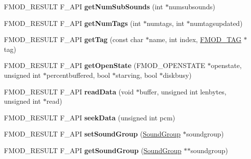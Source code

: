 \begin{DoxyCompactItemize}
\item 
F\+M\+O\+D\+\_\+\+R\+E\+S\+U\+LT F\+\_\+\+A\+PI {\bfseries get\+Num\+Sub\+Sounds} (int $\ast$numsubsounds)\hypertarget{class_f_m_o_d_1_1_sound_ade84503ee47f6c08a1116899c4b59ab7}{}\label{class_f_m_o_d_1_1_sound_ade84503ee47f6c08a1116899c4b59ab7}

\item 
F\+M\+O\+D\+\_\+\+R\+E\+S\+U\+LT F\+\_\+\+A\+PI {\bfseries get\+Num\+Tags} (int $\ast$numtags, int $\ast$numtagsupdated)\hypertarget{class_f_m_o_d_1_1_sound_af676bc0be9a87128c8b09f104a4ce31c}{}\label{class_f_m_o_d_1_1_sound_af676bc0be9a87128c8b09f104a4ce31c}

\item 
F\+M\+O\+D\+\_\+\+R\+E\+S\+U\+LT F\+\_\+\+A\+PI {\bfseries get\+Tag} (const char $\ast$name, int index, \hyperlink{struct_f_m_o_d___t_a_g}{F\+M\+O\+D\+\_\+\+T\+AG} $\ast$tag)\hypertarget{class_f_m_o_d_1_1_sound_abb0b254a45594e485e95ed4eab9fd1b3}{}\label{class_f_m_o_d_1_1_sound_abb0b254a45594e485e95ed4eab9fd1b3}

\item 
F\+M\+O\+D\+\_\+\+R\+E\+S\+U\+LT F\+\_\+\+A\+PI {\bfseries get\+Open\+State} (F\+M\+O\+D\+\_\+\+O\+P\+E\+N\+S\+T\+A\+TE $\ast$openstate, unsigned int $\ast$percentbuffered, bool $\ast$starving, bool $\ast$diskbusy)\hypertarget{class_f_m_o_d_1_1_sound_a2c3115f9bd9343b7d3b09b2e4edbb8b3}{}\label{class_f_m_o_d_1_1_sound_a2c3115f9bd9343b7d3b09b2e4edbb8b3}

\item 
F\+M\+O\+D\+\_\+\+R\+E\+S\+U\+LT F\+\_\+\+A\+PI {\bfseries read\+Data} (void $\ast$buffer, unsigned int lenbytes, unsigned int $\ast$read)\hypertarget{class_f_m_o_d_1_1_sound_af58de66a892b9e49a513502288cf930b}{}\label{class_f_m_o_d_1_1_sound_af58de66a892b9e49a513502288cf930b}

\item 
F\+M\+O\+D\+\_\+\+R\+E\+S\+U\+LT F\+\_\+\+A\+PI {\bfseries seek\+Data} (unsigned int pcm)\hypertarget{class_f_m_o_d_1_1_sound_ac73572153744ba36367391939cd3bc5e}{}\label{class_f_m_o_d_1_1_sound_ac73572153744ba36367391939cd3bc5e}

\item 
F\+M\+O\+D\+\_\+\+R\+E\+S\+U\+LT F\+\_\+\+A\+PI {\bfseries set\+Sound\+Group} (\hyperlink{class_f_m_o_d_1_1_sound_group}{Sound\+Group} $\ast$soundgroup)\hypertarget{class_f_m_o_d_1_1_sound_a6433c4494cbb472ef1d9cf214749dc01}{}\label{class_f_m_o_d_1_1_sound_a6433c4494cbb472ef1d9cf214749dc01}

\item 
F\+M\+O\+D\+\_\+\+R\+E\+S\+U\+LT F\+\_\+\+A\+PI {\bfseries get\+Sound\+Group} (\hyperlink{class_f_m_o_d_1_1_sound_group}{Sound\+Group} $\ast$$\ast$soundgroup)\hypertarget{class_f_m_o_d_1_1_sound_a146bf9b59d99685b313f95e3460a4b8b}{}\label{class_f_m_o_d_1_1_sound_a146bf9b59d99685b313f95e3460a4b8b}


\end{DoxyCompactItemize}
